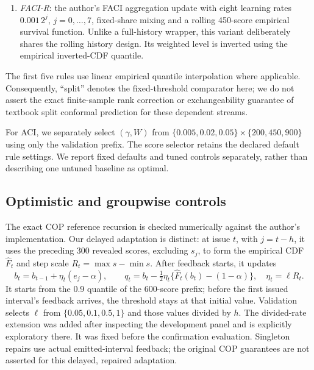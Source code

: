 \begin{enumerate}
the author implementation \citep{bhatnagar2023saocp}, with default lifetime multiplier 8
and prefix scale $\sqrt{3}M$. The accelerated residual-score implementation agrees
numerically with an independent driver of the original expert class. For signed CQR we
remove its nonnegative projection; with delayed feedback, experts process scores in
reveal order. These are declared extensions, without transferring the original theorem
to the modified setting.
\item \emph{FACI-R}: the author's FACI aggregation update with eight learning rates
$0.001\,2^j$, $j=0,\ldots,7$, fixed-share mixing and a rolling 450-score empirical survival
function. Unlike a full-history wrapper, this variant deliberately shares the rolling
history design. Its weighted level is inverted using the empirical inverted-CDF quantile.
\end{enumerate}
The first five rules use linear empirical quantile interpolation where applicable.
Consequently, ``split'' denotes the fixed-threshold comparator here; we do not assert
the exact finite-sample rank correction or exchangeability guarantee of textbook split
conformal prediction for these dependent streams.

For ACI, we separately select $(\gamma,W)$ from
$\{0.005,0.02,0.05\}\times\{200,450,900\}$ using only the validation prefix.
The score selector retains the declared default rule settings. We report fixed defaults
and tuned controls separately, rather than describing one untuned baseline as optimal.


\subsection{Optimistic and groupwise controls}
The exact COP reference recursion is checked numerically against the author's
implementation. Our delayed adaptation is distinct: at issue $t$, with $j=t-h$,
it uses the preceding 300 revealed scores, excluding $s_j$, to form the empirical
CDF $\widehat F_t$ and step scale $R_t=\max s-\min s$. After feedback starts, it updates
\begin{equation}\label{eq:cop}
 b_t=b_{t-1}+\eta_t(e_j-\alpha),\qquad
 q_t=b_t-\tfrac12\eta_t\{\widehat F_t(b_t)-(1-\alpha)\},\quad \eta_t=\ell R_t.
\end{equation}
It starts from the 0.9 quantile of the 600-score prefix; before the first issued
interval's feedback arrives, the threshold stays at that initial value.
Validation selects $\ell$ from $\{0.05,0.1,0.5,1\}$ and those values divided by $h$.
The divided-rate extension was added after inspecting the development panel and is
explicitly exploratory there. It was fixed before the confirmation evaluation.
Singleton repairs use actual emitted-interval feedback; the original COP guarantees
are not asserted for this delayed, repaired adaptation.

